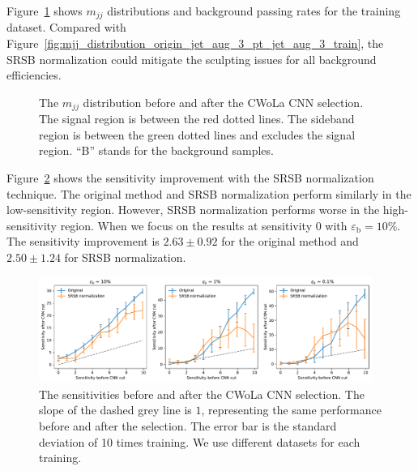 \documentclass[12pt]{article}
\begin{document}
            Figure~\ref{fig:mjj_distribution_srsb_normalized_origin_train} shows $m_{jj}$ distributions and background passing rates for the training dataset. Compared with Figure~\ref{fig:mjj_distribution_origin_jet_aug_3_pt_jet_aug_3_train}, the SRSB normalization could mitigate the sculpting issues for all background efficiencies.
            \begin{figure}[htpb]
                \centering
                \caption{The $m_{jj}$ distribution before and after the CWoLa CNN selection. The signal region is between the red dotted lines. The sideband region is between the green dotted lines and excludes the signal region. ``B'' stands for the background samples.}
                \label{fig:mjj_distribution_srsb_normalized_origin_train}
            \end{figure}

             Figure~\ref{fig:sensitivity_improvement_background_subtraction_origin_srsb_normalized} shows the sensitivity improvement with the SRSB normalization technique. The original method and SRSB normalization perform similarly in the low-sensitivity region. However, SRSB normalization performs worse in the high-sensitivity region. When we focus on the results at sensitivity 0 with $\varepsilon_{\text{b}} = 10\%$. The sensitivity improvement is $2.63 \pm 0.92$ for the original method and $2.50 \pm 1.24$ for SRSB normalization. 
            \begin{figure}[htpb]
                \centering
                \includegraphics[width=0.97\textwidth]{HVmodel_sensitivity_improvement_origin_SRSB_normalied.pdf}
                \caption{The sensitivities before and after the CWoLa CNN selection. The slope of the dashed grey line is $1$, representing the same performance before and after the selection. The error bar is the standard deviation of 10 times training. We use different datasets for each training.}
                \label{fig:sensitivity_improvement_background_subtraction_origin_srsb_normalized}
            \end{figure}
\end{document}
